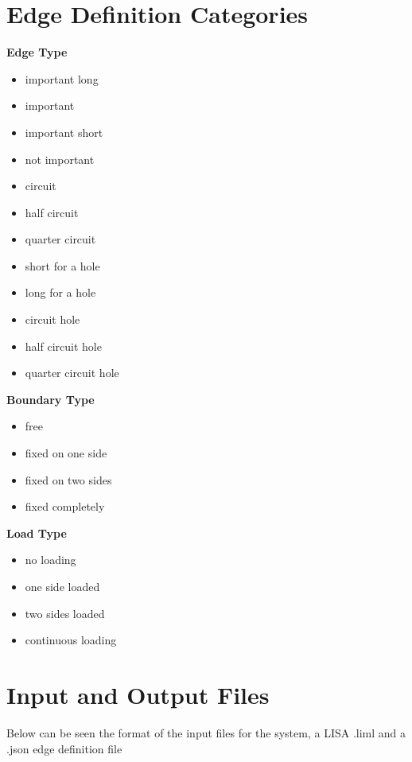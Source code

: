 
\section{Edge Definition Categories}

\textbf{Edge Type}
\begin{itemize}
  \item important long
  \item important
  \item important short
  \item not important
  \item circuit
  \item half circuit
  \item quarter circuit
  \item short for a hole
  \item long for a hole
  \item circuit hole
  \item half circuit hole
  \item quarter circuit hole
\end{itemize}

\textbf{Boundary Type}
\begin{itemize}
  \item free
  \item fixed on one side
  \item fixed on two sides
  \item fixed completely
\end{itemize}

\textbf{Load Type}
\begin{itemize}
  \item no loading
  \item one side loaded
  \item two sides loaded
  \item continuous loading
\end{itemize}

\section{Input and Output Files}
Below can be seen the format of the input files for the system, a LISA .liml and a .json edge definition file\\

